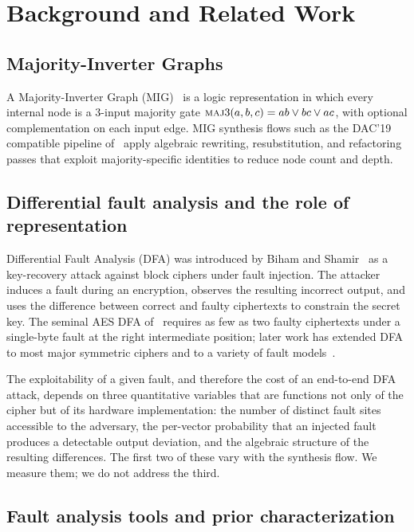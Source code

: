 \section{Background and Related Work}
\label{sec:background}

\subsection{Majority-Inverter Graphs}
\label{sec:background:mig}

A Majority-Inverter Graph (MIG)~\cite{amaru2014mig} is a logic
representation in which every internal node is a 3-input majority
gate $\textsc{maj}3(a, b, c) = ab \lor bc \lor ac$, with optional
complementation on each input edge. MIG synthesis flows such as the
DAC'19 compatible pipeline of~\cite{amaru2019synth} apply algebraic
rewriting, resubstitution, and refactoring passes that exploit
majority-specific identities to reduce node count and depth.

\subsection{Differential fault analysis and the role of representation}
\label{sec:background:dfa}

Differential Fault Analysis (DFA) was introduced
by Biham and Shamir~\cite{biham1997dfa} as a key-recovery attack
against block ciphers under fault injection. The attacker induces a
fault during an encryption, observes the resulting incorrect output,
and uses the difference between correct and faulty ciphertexts to
constrain the secret key. The seminal AES DFA
of~\cite{piret2003dfa} requires as few as two faulty ciphertexts
under a single-byte fault at the right intermediate position; later
work has extended DFA to most major symmetric ciphers and to a
variety of fault models~\cite{bareltal2006fault, joye2012faultattacks}.

The exploitability of a given fault, and therefore the cost of an
end-to-end DFA attack, depends on three quantitative variables
that are functions not only of the cipher but of its hardware
implementation: the number of distinct fault sites accessible to
the adversary, the per-vector probability that an injected fault
produces a detectable output deviation, and the algebraic structure
of the resulting differences. The first two of these vary with the
synthesis flow. We measure them; we do not address the third.

\subsection{Fault analysis tools and prior characterization}
\label{sec:background:tools}

